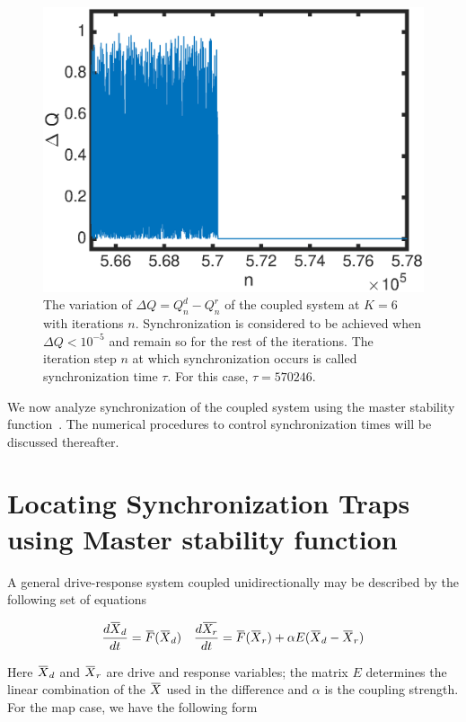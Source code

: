\documentclass[reprint,superscriptaddress,amsmath,amssymb,aps,pre]{revtex4-1}
\newcommand{\overbar}[1]{\mkern 1.5mu\overline{\mkern-1.5mu#1\mkern-1.5mu}\mkern 1.5mu}
\begin{document}
\begin{figure}[t]
	\includegraphics[scale=.4]{Sync_exmaple}
	\caption{\label{fig:sync_ex} \footnotesize The variation of $\Delta Q = Q^d_n-Q^r_n$ of the coupled system at $K = 6$ with iterations $n$. Synchronization is considered to be achieved when $\Delta Q < 10^{-5}$ and remain so for the rest of the iterations. The iteration step $n$ at which synchronization occurs is called synchronization time $\tau$. For this case, $\tau = 570 246.$ }
\end{figure}

We now analyze synchronization of the coupled system using the master stability function~\cite{Pecora1998}. The numerical procedures to control synchronization times will be discussed thereafter.  

\section{Locating Synchronization Traps using Master stability function}
\label{Master stability function}
A general drive-response system coupled unidirectionally may be described by the following set of equations

\begin{align}
\frac{d\overbar{X}_d}{dt} = \overbar{F}(\overbar{X}_d) \nonumber  &&
\frac{d\overbar{X_r}}{dt} = \overbar{F}(\overbar{X}_r) + \alpha E(\overbar{X}_d-\overbar{X}_r)
\end{align}

Here $\overbar{X}_d$ and $\overbar{X}_r$ are drive and response variables; the matrix $E$ determines the linear combination of the $\overbar{X}$ used in the difference and $\alpha$ is the coupling strength. For the map case, we have the following form
\end{document}
